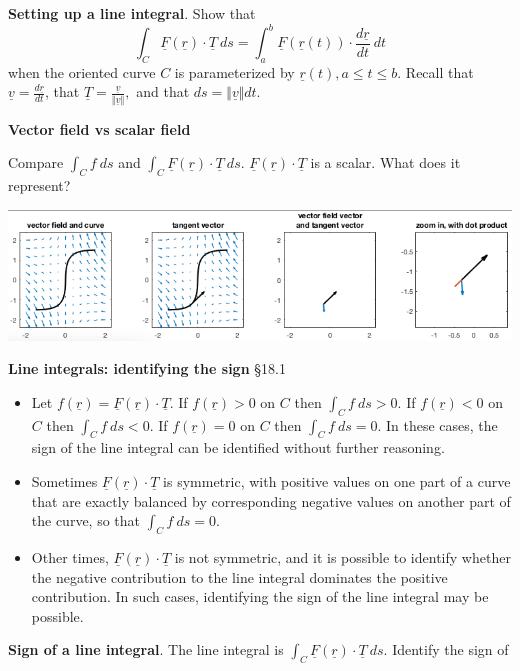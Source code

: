 \documentclass[12pt,letterpaper,noanswers]{exam}
\newcommand{\mb}[1]{\underline{#1}}
\begin{document}
\noindent\textbf{Setting up a line integral}. 
Show that
\[\int_C \mb F(\mb r)\cdot \mb T\ ds = \int_a^b \mb F(\mb r(t))\cdot \frac{d\mb r}{dt}\ dt\] when the oriented curve $C$ is parameterized by $\mb r(t), a\leq t\leq b$. 
Recall that $\displaystyle\mb v = \frac{d\mb r}{dt}$, that $\displaystyle\mb T = \frac{\mb v}{\Vert\mb v\Vert},$ and that $\displaystyle ds = \Vert \mb v\Vert dt$.
\vspace{1in}


\noindent\textbf{Vector field vs scalar field}

Compare $\int_C f\ ds$ and $\int_C \mb F(\mb r)\cdot \mb T\ ds$.  $\mb F(\mb r)\cdot \mb T$ is a scalar.  What does it represent?

\hspace{-0.3in}\includegraphics[width=0.8\linewidth]{img/C25p3-18.png}

\vspace{1in}


\noindent\textbf{Line integrals: identifying the sign} \S 18.1
\begin{tcolorbox}
\begin{itemize}
\itemsep0em
    \item Let $f(\mb r) = \mb F(\mb r)\cdot \mb T$.  If $f(\mb r)>0$ on $C$ then $\int_C f\ ds>0$.  If $f(\mb r)<0$ on $C$ then $\int_C f\ ds < 0$.  If $f(\mb r) = 0$ on $C$ then $\int_C f\ ds = 0$.  In these cases, the sign of the line integral can be identified without further reasoning.
    \item Sometimes $\mb F(\mb r)\cdot \mb T$ is symmetric, with positive values on one part of a curve that are exactly balanced by corresponding negative values on another part of the curve, so that $\int_C f\ ds = 0$.
    \item Other times, $\mb F(\mb r)\cdot \mb T$ is not symmetric, and it is possible to identify whether the negative contribution to the line integral dominates the positive contribution.  In such cases, identifying the sign of the line integral may be possible.
\end{itemize}
\end{tcolorbox}

\noindent\textbf{Sign of a line integral}.
The line integral is $\displaystyle\int_C \mb F(\mb r)\cdot \mb T\ ds$.  Identify the sign of 
\end{document}
